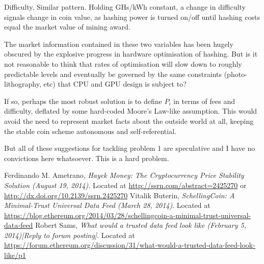 \documentclass[twocolumn]{article}
\begin{document}
Difficulty. Similar pattern. Holding GHs/kWh constant, a change in
difficulty signals change in coin value, as hashing power is turned
on/off until hashing costs equal the market value of mining award. 

The market information contained in these two variables has been
hugely obscured by the explosive progress in hardware optimisation of
hashing. But is it not reasonable to think that rates of optimisation
will slow down to roughly predictable levels and eventually be
governed by the same constraints (photo-lithography, etc) that CPU and
GPU design is subject to? 

If so, perhaps the most robust solution is to define $P_{i}$ in terms
of fees and difficulty, deflated by some hard-coded Moore's Law-like
assumption. This would avoid the need to represent market facts about
the outside world at all, keeping the stable coin scheme autonomous
and self-referential. 

But all of these suggestions for tackling problem 1 are speculative
and I have no convictions here whatsoever. This is a hard problem.

\begin{thebibliography}{9}
Ferdinando M. Ametrano,
  \emph{Hayek Money: The Cryptocurrency Price Stability Solution
    (August 19, 2014)}.
Located at \url{http://ssrn.com/abstract=2425270} or
\url{http://dx.doi.org/10.2139/ssrn.2425270}
Vitalik Buterin, \emph{SchellingCoin: A Minimal-Trust Universal Data Feed (March 28,
  2014)}. Located at
\url{https://blog.ethereum.org/2014/03/28/schellingcoin-a-minimal-trust-universal-data-feed}
Robert Sams, \emph{What would a trusted data feed look like (February 5,
  2014)[Reply to forum posting]}. Located at \url{https://forum.ethereum.org/discussion/31/what-would-a-trusted-data-feed-look-like/p1}
  \end{thebibliography}
\end{document}
